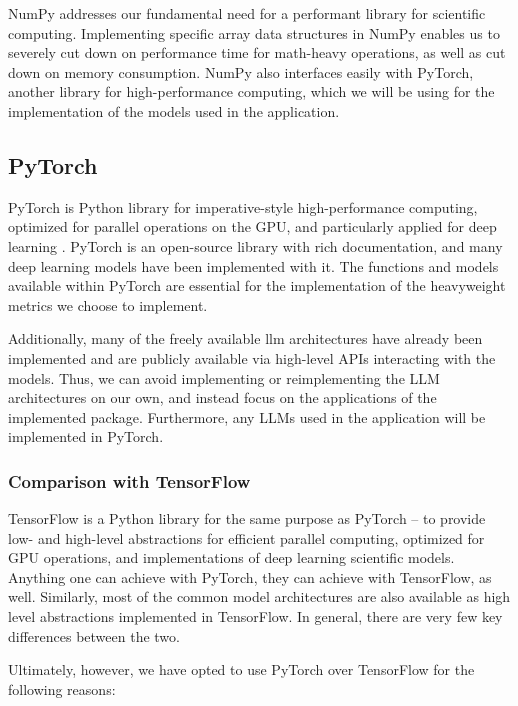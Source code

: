 NumPy addresses our fundamental need for a performant library for scientific computing. Implementing specific array data structures in NumPy enables us to severely cut down on performance time for math-heavy operations, as well as cut down on memory consumption. NumPy also interfaces easily with PyTorch, another library for high-performance computing, which we will be using for the implementation of the models used in the application.

\subsection{PyTorch}\label{sec:pytorch}
PyTorch is Python library for imperative-style high-performance computing, optimized for parallel operations on the GPU, and particularly applied for deep learning \citep{NEURIPS2019_9015_pytorch}. PyTorch is an open-source library with rich documentation, and many deep learning models have been implemented with it. The functions and models available within PyTorch are essential for the implementation of the heavyweight metrics we choose to implement. 

Additionally, many of the freely available \acrfull{llm} architectures have already been implemented and are publicly available via high-level APIs interacting with the models. Thus, we can avoid implementing or reimplementing the LLM architectures on our own, and instead focus on the applications of the implemented package. Furthermore, any LLMs used in the application will be implemented in PyTorch.

\subsubsection*{\textbf{Comparison with TensorFlow}}
TensorFlow is a Python library for the same purpose as PyTorch -- to provide low- and high-level abstractions for efficient parallel computing, optimized for GPU operations, and implementations of deep learning scientific models. Anything one can achieve with PyTorch, they can achieve with TensorFlow, as well. Similarly, most of the common model architectures are also available as high level abstractions implemented in TensorFlow. In general, there are very few key differences between the two.

Ultimately, however, we have opted to use PyTorch over TensorFlow for the following reasons:

